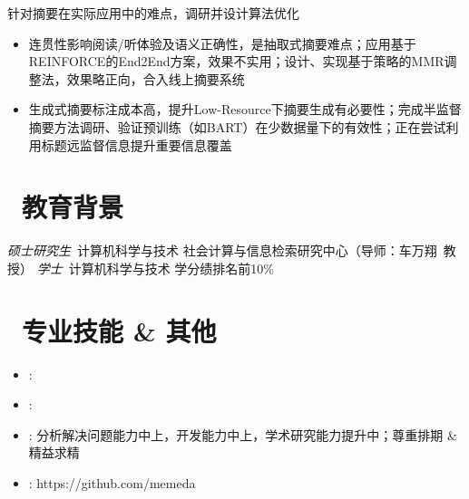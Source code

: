 \documentclass{resume}
\begin{document}
\begin{onehalfspacing} 
针对摘要在实际应用中的难点，调研并设计算法优化
\begin{itemize}
  \item 连贯性影响阅读/听体验及语义正确性，是抽取式摘要难点；应用基于REINFORCE的End2End方案，效果不实用；设计、实现基于策略的MMR调整法，效果略正向，合入线上摘要系统
  \item 生成式摘要标注成本高，提升Low-Resource下摘要生成有必要性；完成半监督摘要方法调研、验证预训练（如BART）在少数据量下的有效性；正在尝试利用标题远监督信息提升重要信息覆盖
\end{itemize}
\end{onehalfspacing}

\section{\faGraduationCap\ 教育背景}
\textit{硕士研究生}\ 计算机科学与技术 \hfill 社会计算与信息检索研究中心（导师：车万翔\ 教授）
\textit{学士}\ 计算机科学与技术 \hfill 学分绩排名前10\%


\section{\faCogs\ 专业技能 \& 其他}
\begin{onehalfspacing} 
\begin{itemize}
  \item {}:  
  \item {}:  
  \item {}:  分析解决问题能力中上，开发能力中上，学术研究能力提升中；尊重排期 \& 精益求精
  \item {}: https://github.com/memeda
\end{itemize}  
\end{onehalfspacing}
  

%
%
\end{document}
